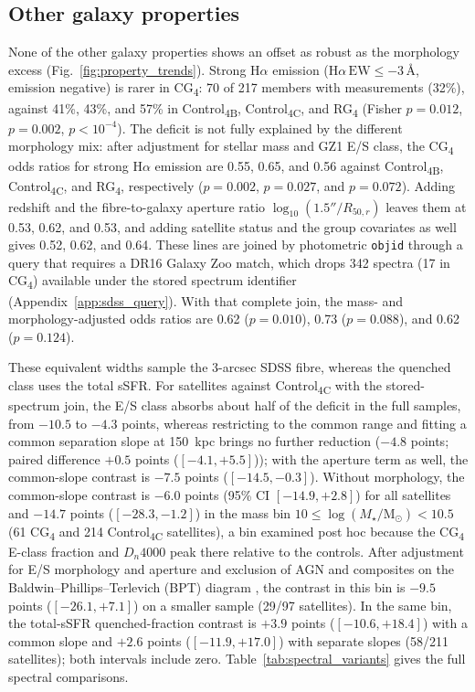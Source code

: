 \documentclass{aa}
\newcommand{\CB}{Control\textsubscript{4B}}
\newcommand{\CC}{Control\textsubscript{4C}}
\newcommand{\CG}{CG\textsubscript{4}}
\newcommand{\RG}{RG\textsubscript{4}}
\newcommand{\msun}{\mathrm{M}_\odot}
\begin{document}
\subsection{Other galaxy properties}\label{sec:other_properties}





None of the other galaxy properties shows an offset as robust as the morphology excess (Fig.~\ref{fig:property_trends}). Strong \(\mathrm{H}\alpha\) emission (\(\mathrm{H}\alpha\,\mathrm{EW} \leq -3\,\text{\AA}\), emission negative) is rarer in \CG{}: 70 of 217 members with measurements (32\%), against 41\%, 43\%, and 57\% in \CB{}, \CC{}, and \RG{} (Fisher \(p = 0.012\), \(p = 0.002\), \(p<10^{-4}\)). The deficit is not fully explained by the different morphology mix: after adjustment for stellar mass and GZ1 E/S class, the \CG{} odds ratios for strong \(\mathrm{H}\alpha\) emission are 0.55, 0.65, and 0.56 against \CB{}, \CC{}, and \RG{}, respectively (\(p = 0.002\), \(p = 0.027\), and \(p = 0.072\)). Adding redshift and the fibre-to-galaxy aperture ratio \(\log_{10}(1.5''/R_{50,r})\) leaves them at 0.53, 0.62, and 0.53, and adding satellite status and the group covariates as well gives 0.52, 0.62, and 0.64. These lines are joined by photometric \texttt{objid} through a query that requires a DR16 Galaxy Zoo match, which drops 342 spectra (17 in \CG{}) available under the stored spectrum identifier (Appendix~\ref{app:sdss_query}). With that complete join, the mass- and morphology-adjusted odds ratios are 0.62 (\(p = 0.010\)), 0.73 (\(p = 0.088\)), and 0.62 (\(p = 0.124\)).

These equivalent widths sample the 3-arcsec SDSS fibre, whereas the quenched class uses the total sSFR. For satellites against \CC{} with the stored-spectrum join, the E/S class absorbs about half of the deficit in the full samples, from \(-10.5\) to \(-4.3\) points, whereas restricting to the common range and fitting a common separation slope at 150~kpc brings no further reduction (\(-4.8\) points; paired difference \(+0.5\) points (\([-4.1, +5.5]\))); with the aperture term as well, the common-slope contrast is \(-7.5\) points (\([-14.5, -0.3]\)). Without morphology, the common-slope contrast is \(-6.0\) points (95\% CI \([-14.9, +2.8]\)) for all satellites and \(-14.7\) points (\([-28.3, -1.2]\)) in the mass bin \(10 \le \log(M_\star/\msun) < 10.5\) (61 \CG{} and 214 \CC{} satellites), a bin examined post hoc because the \CG{} E-class fraction and \(D_n4000\) peak there relative to the controls. After adjustment for E/S morphology and aperture and exclusion of AGN and composites on the Baldwin--Phillips--Terlevich (BPT) diagram \citep{BPT81}, the contrast in this bin is \(-9.5\) points (\([-26.1, +7.1]\)) on a smaller sample (29/97 satellites). In the same bin, the total-sSFR quenched-fraction contrast is \(+3.9\) points (\([-10.6, +18.4]\)) with a common slope and \(+2.6\) points (\([-11.9, +17.0]\)) with separate slopes (58/211 satellites); both intervals include zero. Table~\ref{tab:spectral_variants} gives the full spectral comparisons.
\end{document}
